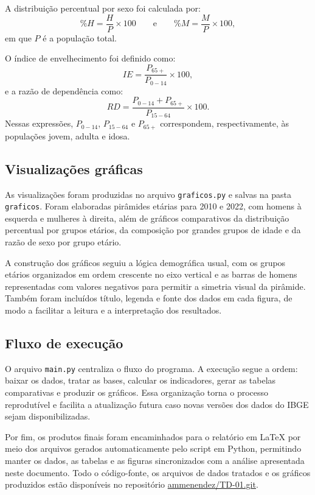 \documentclass[a4paper,12pt]{article}
\begin{document}
A distribuição percentual por sexo foi calculada por:
\[
\%H = \frac{H}{P} \times 100
\qquad \text{e} \qquad
\%M = \frac{M}{P} \times 100,
\]
em que \(P\) é a população total.

O índice de envelhecimento foi definido como:
\[
IE = \frac{P_{65+}}{P_{0-14}} \times 100,
\]
e a razão de dependência como:
\[
RD = \frac{P_{0-14} + P_{65+}}{P_{15-64}} \times 100.
\]
Nessas expressões, \(P_{0-14}\), \(P_{15-64}\) e \(P_{65+}\) correspondem,
respectivamente, às populações jovem, adulta e idosa.

\subsection{Visualizações gráficas}

As visualizações foram produzidas no arquivo \texttt{graficos.py} e salvas na
pasta \texttt{graficos}. Foram elaboradas pirâmides etárias para 2010 e 2022,
com homens à esquerda e mulheres à direita, além de gráficos comparativos da
distribuição percentual por grupos etários, da composição por grandes grupos de
idade e da razão de sexo por grupo etário.

A construção dos gráficos seguiu a lógica demográfica usual, com os grupos
etários organizados em ordem crescente no eixo vertical e as barras de homens
representadas com valores negativos para permitir a simetria visual da
pirâmide. Também foram incluídos título, legenda e fonte dos dados em cada
figura, de modo a facilitar a leitura e a interpretação dos resultados.

\subsection{Fluxo de execução}

O arquivo \texttt{main.py} centraliza o fluxo do programa. A execução segue a
ordem: baixar os dados, tratar as bases, calcular os indicadores, gerar as
tabelas comparativas e produzir os gráficos. Essa organização torna o processo
reprodutível e facilita a atualização futura caso novas versões dos dados do
IBGE sejam disponibilizadas.

Por fim, os produtos finais foram encaminhados para o relatório em LaTeX por
meio dos arquivos gerados automaticamente pelo script em Python, permitindo
manter os dados, as tabelas e as figuras sincronizados com a análise apresentada
neste documento. Todo o código-fonte, os arquivos de dados tratados e os
gráficos produzidos estão disponíveis no repositório
\href{https://github.com/ammenendez/TD-01.git}{ammenendez/TD-01.git}.
\end{document}
